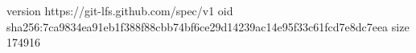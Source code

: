 version https://git-lfs.github.com/spec/v1
oid sha256:7ca9834ea91eb1f388f88cbb74bf6ce29d14239ac14e95f33c61fcd7e8dc7eea
size 174916
